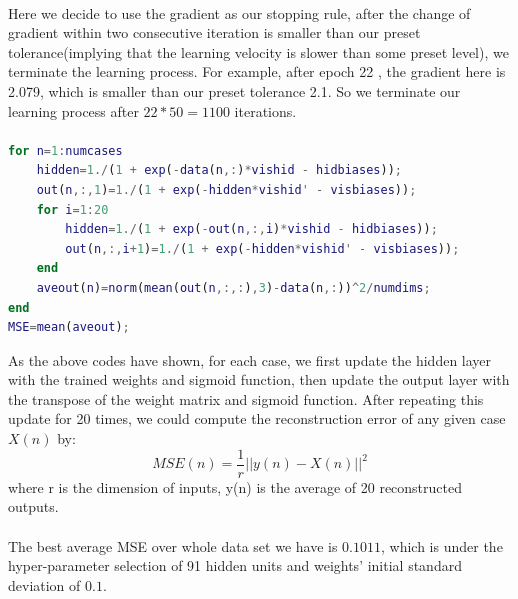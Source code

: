 \documentclass{article}
\begin{document}
\paragraph{}Here we decide to use the gradient as our stopping rule, after the change of gradient within two consecutive iteration is smaller than our preset tolerance(implying that the learning velocity is slower than some preset level), we terminate the learning process. For example, after epoch 22 , the gradient here is 2.079, which is smaller than our preset tolerance 2.1. So we terminate our learning process after $22*50=1100$ iterations.
\paragraph{}
\begin{lstlisting}[language=Matlab]
for n=1:numcases
    hidden=1./(1 + exp(-data(n,:)*vishid - hidbiases));
    out(n,:,1)=1./(1 + exp(-hidden*vishid' - visbiases));
    for i=1:20
        hidden=1./(1 + exp(-out(n,:,i)*vishid - hidbiases));
        out(n,:,i+1)=1./(1 + exp(-hidden*vishid' - visbiases));
    end
    aveout(n)=norm(mean(out(n,:,:),3)-data(n,:))^2/numdims;
end
MSE=mean(aveout);
\end{lstlisting}
As the above codes have shown, for each case, we first update the hidden layer with the trained weights and sigmoid function, then update the output layer with the transpose of the weight matrix and sigmoid function. After repeating this update for 20 times, we could compute the reconstruction error of any given case $X(n)$ by:
\[MSE(n)=\frac1r||y(n)-X(n)||^2\]
where r is the dimension of inputs, y(n) is the average of 20 reconstructed outputs.
\paragraph{}The best average MSE over whole data set we have is $0.1011$, which is under the hyper-parameter selection of 91 hidden units and weights' initial standard deviation of $0.1$.
\end{document}
